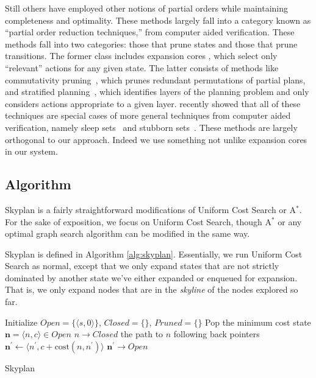 \documentclass[letterpaper]{article}
\theoremstyle{plain} \newtheorem{theorem}{Theorem} \newtheorem{proposition}{Proposition} \newtheorem{lemma}{Lemma}
\theoremstyle{definition} \newtheorem{definition}{Definition} \newtheorem{conjecture}{Conjecture} \newtheorem*{example}{Example}
\theoremstyle{remark} \newtheorem*{remark}{Remark} \newtheorem*{note}{Note} \newtheorem{case}{Case}
\begin{document}
Still others have employed other notions of partial orders while
maintaining completeness and optimality. These methods largely fall
into a category known as ``partial order reduction techniques,''
from computer aided verification. These methods fall into two
categories: those that prune states and those that prune transitions.
The former class includes expansion cores \cite{chen09completeness,
xu11theory}, which select only ``relevant'' actions for any given
state. The latter consists of methods like commutativity
pruning~\cite{geffner2000admissible}, which prunes redundant
permutations of partial plans, and stratified
planning~\cite{chen2009stratified}, which identifies layers of the
planning problem and only considers actions appropriate to a given
layer. \citet{wehrle2012partial} recently showed that all of these
techniques are special cases of more general techniques from computer
aided verification, namely sleep sets~\cite{godefroid96partial} and
stubborn sets~\cite{valmari92stubborn}. These methods are largely
orthogonal to our approach. Indeed we use something not unlike
expansion cores in our system.


\subsection{Algorithm}

Skyplan is a fairly straightforward modifications of Uniform
Cost Search or A$^*$. For the sake of exposition, we focus on Uniform Cost
Search, though A$^*$ or any optimal graph search algorithm can
be modified in the same way.

Skyplan is defined in Algorithm \ref{alg:skyplan}. Essentially, we run Uniform Cost Search as normal, except that 
we only expand states that are not strictly dominated by another
state we've either expanded or enqueued for expansion. That is, we only expand nodes that are in the \textit{skyline}
of the nodes explored so far.

\begin{algorithm}
  \begin{algorithmic}[1]
    \State Initialize $Open=\{\langle s,0\rangle\}$, $Closed=\{\}$, $Pruned=\{\}$
    \State Pop the minimum cost state $\mathbf{n} = \langle n,c\rangle\in Open$
      \State $n\rightarrow Closed$
        \State \Return the path to $n$ following back pointers
      \EndIf
      \State $\mathbf{n^\prime} \gets \langle n^\prime,c+\mathrm{cost}(n,n^\prime)\rangle$
        \State $\mathbf{n^\prime} \rightarrow Open$
        \EndIf
      \EndFor
    \EndWhile
  \EndProcedure
  \end{algorithmic}
\caption{Skyplan}
\label{alg:skyplan}
\end{algorithm}
\end{document}
